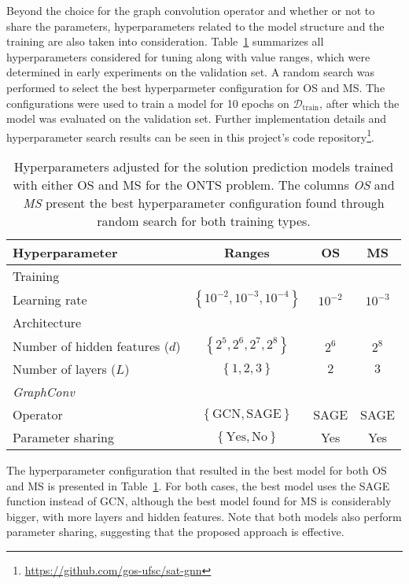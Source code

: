 Beyond the choice for the graph convolution operator and whether or not to share the parameters, hyperparameters related to the model structure and the training are also taken into consideration.
Table~\ref{tab:hyperparameters} summarizes all hyperparameters considered for tuning along with value ranges, which were determined in early experiments on the validation set.
A random search was performed to select the best hyperparmeter configuration for OS and MS.
The configurations were used to train a model for 10 epochs on $\mathcal{D}_\textrm{train}$, after which the model was evaluated on the validation set.
Further implementation details and hyperparameter search results can be seen in this project's code repository\footnote{\url{https://github.com/gos-ufsc/sat-gnn}}.

\begin{table}[h]
    \centering
    \caption{Hyperparameters adjusted for the solution prediction models trained with either OS and MS for the ONTS problem. The columns  \emph{OS} and \emph{MS} present the best hyperparameter configuration found through random search for both training types.}
    \label{tab:hyperparameters}
    \begin{tabular}{l|c|c|c}
	\toprule
	Hyperparameter & Ranges & OS & MS \\
	\midrule
	Training & & & \\
	\quad Learning rate & $\left\{ 10^{-2}, 10^{-3}, 10^{-4} \right\} $   & $10^{-2}$ & $10^{-3}$ \\
	Architecture &  & & \\
	\quad Number of hidden features ($d$) & $\left\{ 2^{5},2^{6},2^{7},2^{8} \right\} $   & $2^{6}$ & $2^{8}$ \\
	\quad Number of layers ($L$)  & $\left\{ 1, 2, 3 \right\} $   & $2$ & $3$ \\
	\emph{GraphConv} &  & & \\
	\quad Operator & $\left\{ \text{GCN}, \text{SAGE} \right\} $   & SAGE & SAGE \\
	\quad Parameter sharing & $\left\{ \text{Yes}, \text{No} \right\} $   & Yes & Yes \\
	\bottomrule
    \end{tabular}
\end{table}

The hyperparameter configuration that resulted in the best model for both OS and MS is presented in Table~\ref{tab:hyperparameters}.
For both cases, the best model uses the SAGE function instead of GCN, although the best model found for MS is considerably bigger, with more layers and hidden features.
Note that both models also perform parameter sharing, suggesting that the proposed approach is effective.

